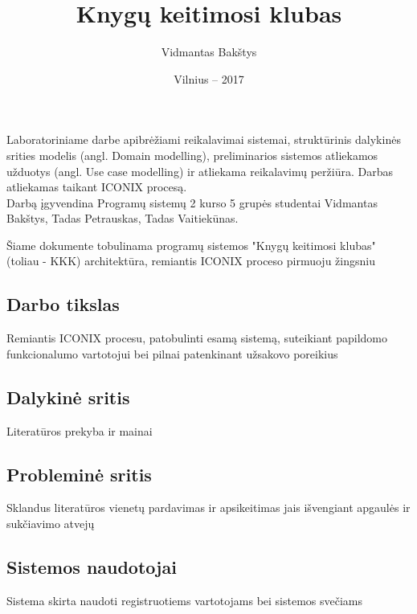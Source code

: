 \documentclass{VUMIFPSkursinis}
\title{Knygų keitimosi klubas}
\author{Vidmantas Bakštys}
\date{Vilnius – 2017}
\begin{document}
\maketitle

\setcounter{tocdepth}{2}

\tableofcontents
{} 

\setcounter{secnumdepth}{0}

Laboratoriniame darbe apibrėžiami reikalavimai sistemai, struktūrinis dalykinės srities modelis (angl. Domain modelling), preliminarios sistemos atliekamos užduotys (angl. Use case modelling) ir atliekama reikalavimų peržiūra. Darbas atliekamas taikant ICONIX procesą.\\
Darbą įgyvendina Programų sistemų 2 kurso 5 grupės studentai Vidmantas Bakštys, Tadas Petrauskas, Tadas Vaitiekūnas.

Šiame dokumente tobulinama programų sistemos "Knygų keitimosi klubas" (toliau - KKK) architektūra, remiantis ICONIX proceso pirmuoju žingsniu

\subsection{Darbo tikslas}
Remiantis ICONIX procesu, patobulinti esamą sistemą, suteikiant papildomo funkcionalumo vartotojui bei pilnai patenkinant užsakovo poreikius

\subsection{Dalykinė sritis}
Literatūros prekyba ir mainai

\subsection{Probleminė sritis}
Sklandus literatūros vienetų pardavimas ir apsikeitimas jais išvengiant apgaulės ir sukčiavimo atvejų

\subsection{Sistemos naudotojai}
Sistema skirta naudoti registruotiems vartotojams bei sistemos svečiams

%
\setcounter{secnumdepth}{4}
\end{document}

